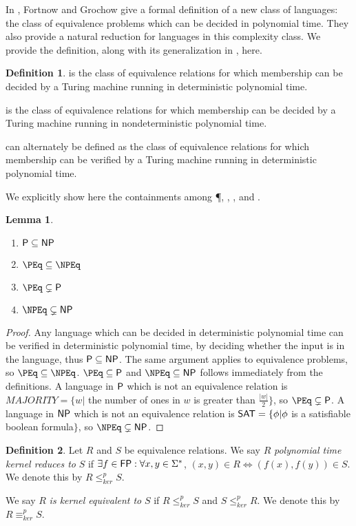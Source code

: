 \documentclass{amsart}
\newtheorem{lemma}[lemma]{Lemma}
\theoremstyle{definition} \newtheorem{definition}[definition]{Definition}
\newcommand{\sigmastar}{\Sigma^{*}} %
\newcommand{\kr}{\leq^{p}_{ker}} %
\newcommand{\kequiv}{\equiv^{p}_{ker}} %
\newcommand{\defn}[1]{\emph{#1}} %
\begin{document}
In \cite{fg09}, Fortnow and Grochow give a formal definition of a new class of
languages: the class of equivalence problems which can be decided in polynomial
time. They also provide a natural reduction for languages in this complexity
class. We provide the definition, along with its generalization in \NP, here.

\begin{definition}\label{def:peq}
  \defn{\PEq} is the class of equivalence relations for which membership can be
  decided by a Turing machine running in deterministic polynomial time.

  \defn{\NPEq} is the class of equivalence relations for which membership can
  be decided by a Turing machine running in nondeterministic polynomial time.

  \defn{\NPEq} can alternately be defined as the class of equivalence relations
  for which membership can be verified by a Turing machine running in
  deterministic polynomial time.
\end{definition}

We explicitly show here the containments among \P, \NP, \PEq, and \NPEq.
\begin{lemma}
  \mbox{} %
  \begin{enumerate}
    \renewcommand{\labelenumi}{\roman{enumi}.}
  \item $\P\subseteq\NP$
  \item $\PEq\subseteq\NPEq$
  \item $\PEq\subsetneq\P$
  \item $\NPEq\subsetneq\NP$
  \end{enumerate}
\end{lemma}
\begin{proof}
  Any language which can be decided in deterministic polynomial time can be
  verified in deterministic polynomial time, by deciding whether the input is
  in the language, thus $\P\subseteq\NP$. The same argument applies to
  equivalence problems, so $\PEq\subseteq\NPEq$.  $\PEq\subseteq\P$ and
  $\NPEq\subseteq\NP$ follows immediately from the definitions. A language in
  $\P$ which is not an equivalence relation is $MAJORITY=\{w|$ the number of
  ones in $w$ is greater than $\frac{|w|}{2}\}$, so $\PEq\subsetneq\P$. A
  language in $\NP$ which is not an equivalence relation is $\SAT=\{\phi|\phi$
  is a satisfiable boolean formula$\}$, so $\NPEq\subsetneq\NP$.
\end{proof}

\begin{definition}\label{def:kr}
  Let $R$ and $S$ be equivalence relations. We say $R$ \defn{polynomial time
    kernel reduces to} $S$ if $\exists f\in\FP:\forall x,y\in\sigmastar$, $(x,
    y)\in R \iff (f(x),f(y))\in S$. We denote this by $R\kr S$.
  
  We say $R$ \defn{is kernel equivalent to} $S$ if $R\kr S$ and $S\kr R$. We
  denote this by $R\kequiv S$.
\end{definition}
\end{document}
